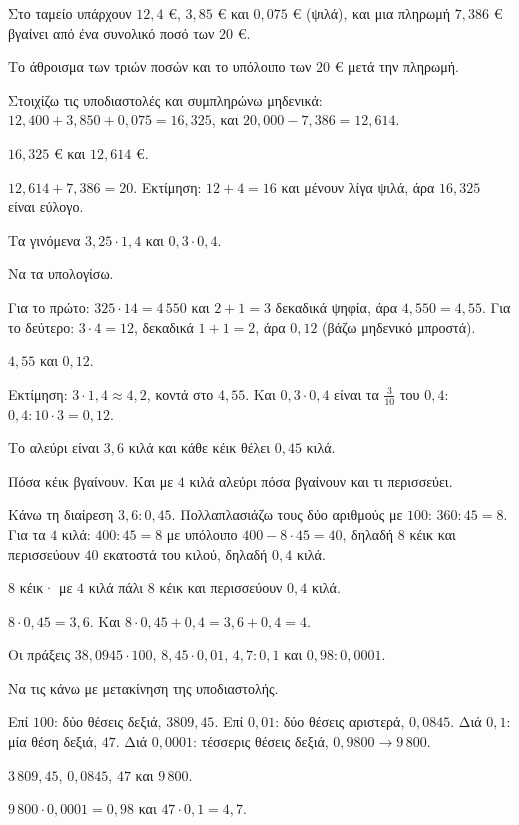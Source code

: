 
\tixero Στο ταμείο υπάρχουν $12{,}4$ €, $3{,}85$ € και $0{,}075$ € (ψιλά), και μια πληρωμή $7{,}386$ € βγαίνει από ένα συνολικό ποσό των $20$ €.\par
\tithelo Το άθροισμα των τριών ποσών και το υπόλοιπο των $20$ € μετά την πληρωμή.\par
\possindeo Στοιχίζω τις υποδιαστολές και συμπληρώνω μηδενικά: $12{,}400+3{,}850+0{,}075=16{,}325$, και $20{,}000-7{,}386=12{,}614$.\par
\apantisi $16{,}325$ € και $12{,}614$ €.\par
\elegxos $12{,}614+7{,}386=20$. Εκτίμηση: $12+4=16$ και μένουν λίγα ψιλά, άρα $16{,}325$ είναι εύλογο.

\tixero Τα γινόμενα $3{,}25\cdot1{,}4$ και $0{,}3\cdot0{,}4$.\par
\tithelo Να τα υπολογίσω.\par
\possindeo Για το πρώτο: $325\cdot14=4\,550$ και $2+1=3$ δεκαδικά ψηφία, άρα $4{,}550=4{,}55$. Για το δεύτερο: $3\cdot4=12$, δεκαδικά $1+1=2$, άρα $0{,}12$ (βάζω μηδενικό μπροστά).\par
\apantisi $4{,}55$ και $0{,}12$.\par
\elegxos Εκτίμηση: $3\cdot1{,}4\approx4{,}2$, κοντά στο $4{,}55$. Και $0{,}3\cdot0{,}4$ είναι τα $\frac{3}{10}$ του $0{,}4$: $0{,}4:10\cdot3=0{,}12$.

\tixero Το αλεύρι είναι $3{,}6$ κιλά και κάθε κέικ θέλει $0{,}45$ κιλά.\par
\tithelo Πόσα κέικ βγαίνουν. Και με $4$ κιλά αλεύρι πόσα βγαίνουν και τι περισσεύει.\par
\possindeo Κάνω τη διαίρεση $3{,}6:0{,}45$. Πολλαπλασιάζω τους δύο αριθμούς με $100$: $360:45=8$. Για τα $4$ κιλά: $400:45=8$ με υπόλοιπο $400-8\cdot45=40$, δηλαδή $8$ κέικ και περισσεύουν $40$ εκατοστά του κιλού, δηλαδή $0{,}4$ κιλά.\par
\apantisi $8$ κέικ· με $4$ κιλά πάλι $8$ κέικ και περισσεύουν $0{,}4$ κιλά.\par
\elegxos $8\cdot0{,}45=3{,}6$. Και $8\cdot0{,}45+0{,}4=3{,}6+0{,}4=4$.

\tixero Οι πράξεις $38{,}0945\cdot100$, $8{,}45\cdot0{,}01$, $4{,}7:0{,}1$ και $0{,}98:0{,}0001$.\par
\tithelo Να τις κάνω με μετακίνηση της υποδιαστολής.\par
\possindeo Επί $100$: δύο θέσεις δεξιά, $3809{,}45$. Επί $0{,}01$: δύο θέσεις αριστερά, $0{,}0845$. Διά $0{,}1$: μία θέση δεξιά, $47$. Διά $0{,}0001$: τέσσερις θέσεις δεξιά, $0{,}9800\to9\,800$.\par
\apantisi $3\,809{,}45$, $0{,}0845$, $47$ και $9\,800$.\par
\elegxos $9\,800\cdot0{,}0001=0{,}98$ και $47\cdot0{,}1=4{,}7$.


